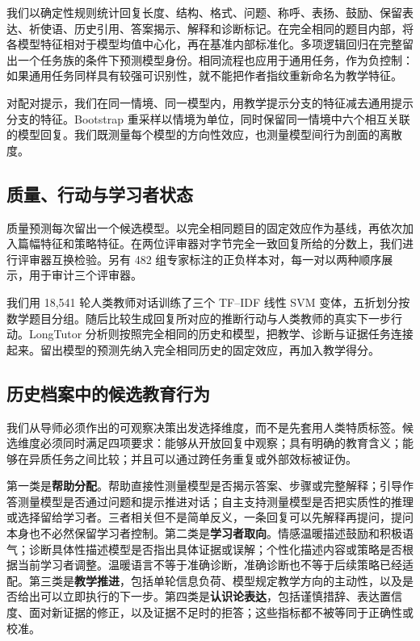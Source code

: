 \documentclass[11pt,a4paper,UTF8]{ctexart}
\begin{document}
我们以确定性规则统计回复长度、结构、格式、问题、称呼、表扬、鼓励、保留表达、祈使语、历史引用、答案揭示、解释和诊断标记。在完全相同的题目内部，将各模型特征相对于模型均值中心化，再在基准内部标准化。多项逻辑回归在完整留出一个任务族的条件下预测模型身份。相同流程也应用于通用任务，作为负控制：如果通用任务同样具有较强可识别性，就不能把作者指纹重新命名为教学特征。

对配对提示，我们在同一情境、同一模型内，用教学提示分支的特征减去通用提示分支的特征。Bootstrap 重采样以情境为单位，同时保留同一情境中六个相互关联的模型回复。我们既测量每个模型的方向性效应，也测量模型间行为剖面的离散度。

\subsection{质量、行动与学习者状态}

质量预测每次留出一个候选模型。以完全相同题目的固定效应作为基线，再依次加入篇幅特征和策略特征。在两位评审器对字节完全一致回复所给的分数上，我们进行评审器互换检验。另有 482 组专家标注的正负样本对，每一对以两种顺序展示，用于审计三个评审器。

我们用 18,541 轮人类教师对话训练了三个 TF--IDF 线性 SVM 变体，五折划分按数学题目分组。随后比较生成回复所对应的推断行动与人类教师的真实下一步行动。LongTutor 分析则按照完全相同的历史和模型，把教学、诊断与证据任务连接起来。留出模型的预测先纳入完全相同历史的固定效应，再加入教学得分。

\subsection{历史档案中的候选教育行为}

我们从导师必须作出的可观察决策出发选择维度，而不是先套用人类特质标签。候选维度必须同时满足四项要求：能够从开放回复中观察；具有明确的教育含义；能够在异质任务之间比较；并且可以通过跨任务重复或外部效标被证伪。

第一类是\textbf{帮助分配}。帮助直接性测量模型是否揭示答案、步骤或完整解释；引导作答测量模型是否通过问题和提示推进对话；自主支持测量模型是否把实质性的推理或选择留给学习者。三者相关但不是简单反义，一条回复可以先解释再提问，提问本身也不必然保留学习者控制。第二类是\textbf{学习者取向}。情感温暖描述鼓励和积极语气；诊断具体性描述模型是否指出具体证据或误解；个性化描述内容或策略是否根据当前学习者调整。温暖语言不等于准确诊断，准确诊断也不等于后续策略已经适配。第三类是\textbf{教学推进}，包括单轮信息负荷、模型规定教学方向的主动性，以及是否给出可以立即执行的下一步。第四类是\textbf{认识论表达}，包括谨慎措辞、表达置信度、面对新证据的修正，以及证据不足时的拒答；这些指标都不被等同于正确性或校准。
\end{document}
